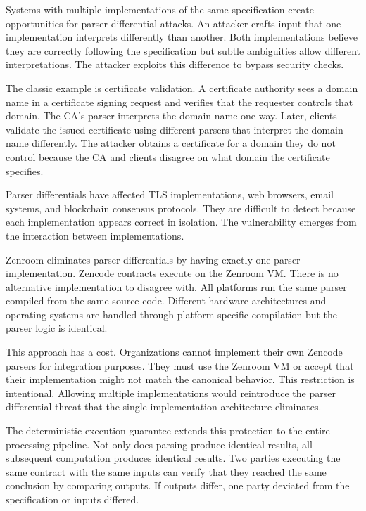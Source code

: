 Systems with multiple implementations of the same specification create
opportunities for parser differential attacks. An attacker crafts
input that one implementation interprets differently than
another. Both implementations believe they are correctly following the
specification but subtle ambiguities allow different
interpretations. The attacker exploits this difference to bypass
security checks.

The classic example is certificate validation. A certificate authority
sees a domain name in a certificate signing request and verifies that
the requester controls that domain. The CA's parser interprets the
domain name one way. Later, clients validate the issued certificate
using different parsers that interpret the domain name
differently. The attacker obtains a certificate for a domain they do
not control because the CA and clients disagree on what domain the
certificate specifies.

Parser differentials have affected TLS implementations, web browsers,
email systems, and blockchain consensus protocols. They are difficult
to detect because each implementation appears correct in
isolation. The vulnerability emerges from the interaction between
implementations.

Zenroom eliminates parser differentials by having exactly one parser
implementation. Zencode contracts execute on the Zenroom VM. There is
no alternative implementation to disagree with. All platforms run the
same parser compiled from the same source code. Different hardware
architectures and operating systems are handled through
platform-specific compilation but the parser logic is identical.

This approach has a cost. Organizations cannot implement their own
Zencode parsers for integration purposes. They must use the Zenroom VM
or accept that their implementation might not match the canonical
behavior. This restriction is intentional. Allowing multiple
implementations would reintroduce the parser differential threat that
the single-implementation architecture eliminates.

The deterministic execution guarantee extends this protection to the
entire processing pipeline. Not only does parsing produce identical
results, all subsequent computation produces identical results. Two
parties executing the same contract with the same inputs can verify
that they reached the same conclusion by comparing outputs. If outputs
differ, one party deviated from the specification or inputs differed.

